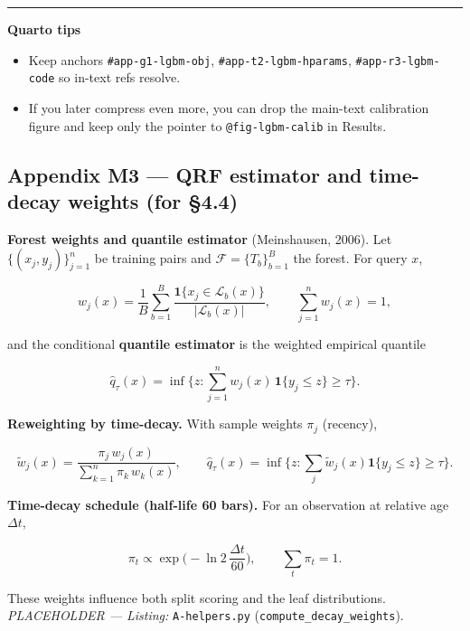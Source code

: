 \documentclass[
  a4paper,
  DIV=11,
  numbers=noendperiod]{scrreprt}
\providecommand{\tightlist}{%
  \setlength{\itemsep}{0pt}\setlength{\parskip}{0pt}}
\begin{document}
\begin{center}\rule{0.5\linewidth}{0.5pt}\end{center}

\textbf{Quarto tips}

\begin{itemize}
\tightlist
\item
  Keep anchors \texttt{\#app-g1-lgbm-obj},
  \texttt{\#app-t2-lgbm-hparams}, \texttt{\#app-r3-lgbm-code} so in-text
  refs resolve.
\item
  If you later compress even more, you can drop the main-text
  calibration figure and keep only the pointer to
  \texttt{@fig-lgbm-calib} in Results.
\end{itemize}

\subsection{Appendix M3 --- QRF estimator and time-decay weights (for
§4.4)}\label{app-m3-qrf}

\textbf{Forest weights and quantile estimator} (Meinshausen, 2006). Let
\(\{(x_j,y_j)\}_{j=1}^{n}\) be training pairs and
\(\mathcal F=\{T_b\}_{b=1}^{B}\) the forest. For query \(x\),

\[
\label{eq-qrf-weights}
w_j(x)=\frac{1}{B}\sum_{b=1}^{B}\frac{\mathbf{1}\{x_j\in\mathcal L_b(x)\}}{|\mathcal L_b(x)|},
\qquad \sum_{j=1}^n w_j(x)=1,
\]

and the conditional \textbf{quantile estimator} is the weighted
empirical quantile

\[
\label{eq-qrf-quantile}
\widehat q_\tau(x)=\inf\Big\{z:\sum_{j=1}^{n} w_j(x)\,\mathbf{1}\{y_j\le z\}\ge \tau\Big\}.
\]

\textbf{Reweighting by time-decay.} With sample weights \(\pi_j\)
(recency),

\[
\label{eq-qrf-reweight}
\tilde w_j(x)=\frac{\pi_j\,w_j(x)}{\sum_{k=1}^n\pi_k\,w_k(x)},\qquad
\widehat q_\tau(x)=\inf\Big\{z:\sum_j \tilde w_j(x)\mathbf{1}\{y_j\le z\}\ge \tau\Big\}.
\]

\textbf{Time-decay schedule (half-life 60 bars).} For an observation at
relative age \(\Delta t\),

\[
\label{eq-decay}
\pi_t \propto \exp\!\Big(-\ln 2\,\frac{\Delta t}{60}\Big),\qquad \sum_t \pi_t=1.
\]

These weights influence both split scoring and the leaf distributions.
\emph{PLACEHOLDER --- Listing:} \texttt{A-helpers.py}
(\texttt{compute\_decay\_weights}).
\end{document}
